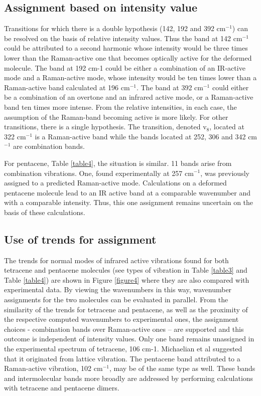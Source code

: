 \subsection*{Assignment based on intensity value}

Transitions for which there is a double hypothesis (142, 192 and 392 cm$^{-1}$) can be resolved on the basis of relative intensity values. Thus the band at 142 cm$^{-1}$ could be attributed to a second harmonic whose intensity would be three times lower than the Raman-active one that becomes optically active for the deformed molecule. The band at 192 cm-1 could be either a combination of an IR-active mode and a Raman-active mode, whose intensity would be ten times lower than a Raman-active band calculated at 196 cm$^{-1}$. The band at 392 cm$^{-1}$ could either be a combination of an overtone and an infrared active mode, or a Raman-active band ten times more intense. From the relative intensities, in each case, the assumption of the Raman-band becoming active is more likely. For other transitions, there is a single hypothesis. The transition, denoted v$_{8}$, located at 322 cm$^{-1}$ is a Raman-active band while the bands located at 252, 306 and 342 cm$^{-1}$ are combination bands. 

For pentacene, Table \ref{table4}, the situation is similar. 11 bands arise from combination vibrations. One, found experimentally at 257 cm$^{-1}$, was previously assigned to a predicted Raman-active mode. Calculations on a deformed pentacene molecule lead to an IR active band at a comparable wavenumber and with a comparable intensity. Thus, this one assignment remains uncertain on the basis of these calculations. 

\subsection*{Use of trends for assignment}

The trends for normal modes of infrared active vibrations found for both tetracene and pentacene molecules (see types of vibration in Table \ref{table3} and Table \ref{table4}) are shown in Figure \ref{figure4} where they are also compared with experimental data. By viewing the wavenumbers in this way, wavenumber assignments for the two molecules can be evaluated in parallel. From the similarity of the trends for tetracene and pentacene, as well as the proximity of the respective computed wavenumbers to experimental ones, the assignment choices - combination bands over Raman-active ones – are supported and this outcome is independent of intensity values. Only one band remains unassigned in the experimental spectrum of tetracene, 106 cm-1. Michaelian et al \cite{michaelian2012far} suggested that it originated from lattice vibration. The pentacene band attributed to a Raman-active vibration, 102 cm$^{-1}$, may be of the same type as well.  These bands and intermolecular bands more broadly are addressed by performing calculations with tetracene and pentacene dimers. 

